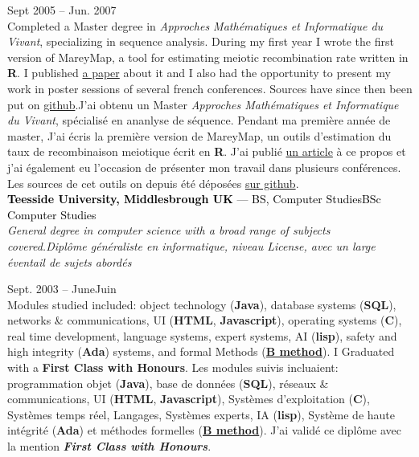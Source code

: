 \documentclass[a4paper]{article}
\newcommand\enfr[2]{\ifdefined\doen#1\else#2\fi\xspace}
\newcommand\js{\textbf{Javascript}\xspace}
\newcommand\sql{\textbf{SQL}\xspace}
\newcommand\clang{\textbf{C}\xspace}
\newcommand\rlang{\textbf{R}\xspace}
\newcommand\java{\textbf{Java}\xspace}
\newcommand\ada{\textbf{Ada}\xspace}
\newcommand\blang{\hyperlink{https://www.methode-b.com/en/b-method/}{\textbf{B method}}\xspace}
\newcommand\html{\textbf{HTML}\xspace}
\newcommand\lisp{\textbf{lisp}\xspace}
\newcommand\entry[2]{\large\textcolor{Black}{\textbf{#1} --- #2}\normalsize}
\newcommand\timespan[2]{\normalsize\textsf{#1 -- #2}}
\begin{document}
\begin{minipage}[t]{0.63\textwidth}
\vspace{0.5em}
\timespan{Sept 2005}{Jun. 2007}\\
\enfr{Completed a Master degree in \textit{Approches Mathématiques et Informatique du
  Vivant}, specializing in sequence analysis. During my first year I
wrote the first version of MareyMap, a tool for estimating meiotic
recombination rate written in \rlang. I published
\hyperlink{https://academic.oup.com/bioinformatics/article/23/16/2188/199692}{a
  paper} about it and I also had the opportunity to present my work in
poster sessions of several french conferences. Sources have since then
been put on \hyperlink{https://github.com/aursiber/MareyMap}{
  github}.}
{J'ai obtenu un Master \textit{Approches Mathématiques et Informatique du
    Vivant}, spécialisé en ananlyse de séquence. Pendant ma première
  année de master, J'ai écris la première version de MareyMap, un
  outils d'estimation du taux de recombinaison meiotique écrit en
  \rlang. J'ai publié \hyperlink{https://academic.oup.com/bioinformatics/article/23/16/2188/199692}{un
  article} à ce propos et j'ai également eu l'occasion de présenter
  mon travail dans plusieurs conférences. Les sources de cet outils on
  depuis été déposées
  \hyperlink{https://github.com/aursiber/MareyMap}{sur github}.}\\

\entry{Teesside University, Middlesbrough UK}{\enfr{BS, Computer Studies}{BSc Computer Studies}}\\
\textit{\enfr{General degree in computer science with a broad range of subjects covered.}
  {Diplôme généraliste en informatique, niveau License, avec un large éventail de sujets abordés}}

\vspace{0.5em}
\timespan{Sept. 2003}{\enfr{June}{Juin} 2005}\\
\enfr{
Modules studied included: object technology (\java), database systems (\sql), networks
\& communications, UI (\html, \js), operating systems (\clang), real time development,
language systems, expert systems, AI (\lisp), safety and high integrity (\ada)
systems, and formal Methods (\blang). I Graduated with a \textbf{First Class
  with Honours}.}{
 Les modules suivis incluaient: programmation objet (\java), base de
 données (\sql), réseaux \& communications, UI (\html, \js), Systèmes
 d'exploitation (\clang), Systèmes temps réel, Langages, Systèmes
 experts, IA (\lisp), Système de haute intégrité (\ada) et méthodes
 formelles (\blang). J'ai validé ce diplôme avec la mention
 \textit{\textbf{First Class with Honours}}.}\\



\end{minipage}
\end{document}
